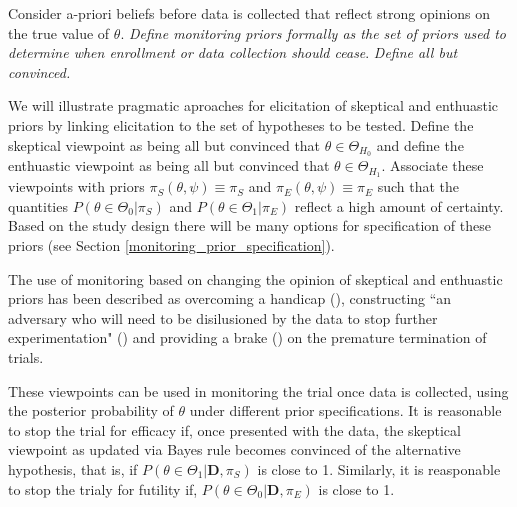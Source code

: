 \documentclass[12pt]{article}
\begin{document}
Consider a-priori beliefs before data is collected that reflect strong opinions on the true value of $\theta$. \textit{Define monitoring priors formally as the set of priors used to determine when enrollment or data collection should cease}. \textit{Define all but convinced.}

We will illustrate pragmatic aproaches for elicitation of skeptical and enthuastic priors by linking elicitation to the set of hypotheses to be tested. Define the skeptical viewpoint as being all but convinced that $\theta\in\Theta_{H_0}$ and define the enthuastic viewpoint as being all but convinced that $\theta\in\Theta_{H_1}$. Associate these viewpoints with priors $\pi_{S}(\theta,\psi)\equiv\pi_{S}$ and $\pi_{E}(\theta,\psi)\equiv\pi_{E}$ such that the quantities $P(\theta\in\Theta_0| \pi_{S})$ and $P(\theta\in\Theta_1| \pi_{E})$ reflect a high amount of certainty. Based on the study design there will be many options for specification of these priors (see Section \ref{monitoring_prior_specification}).

The use of monitoring based on changing the opinion of skeptical and enthuastic priors has been described as overcoming a handicap (\cite{Freedman1989}), constructing ``an adversary who will need to be disilusioned by the data to stop further experimentation" (\cite{Spiegelhalter1994}) and providing a brake (\cite{Fayers1997}) on the premature termination of trials.

These viewpoints can be used in monitoring the trial once data is collected, using the posterior probability of $\theta$ under different prior specifications. It is reasonable to stop the trial for efficacy if, once presented with the data, the skeptical viewpoint as updated via Bayes rule becomes convinced of the alternative hypothesis, that is, if $P(\theta\in\Theta_1|\mathbf{D}, \pi_{S})$ is close to 1. Similarly, it is reasponable to stop the trialy for futility if, $P(\theta\in\Theta_0|\mathbf{D}, \pi_{E})$ is close to 1.
\end{document}
